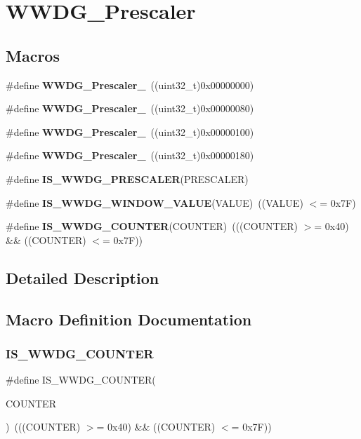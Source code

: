 \section{W\+W\+D\+G\+\_\+\+Prescaler}
\label{group__WWDG__Prescaler}
\subsection*{Macros}
\begin{DoxyCompactItemize}
\item 
\#define \textbf{ W\+W\+D\+G\+\_\+\+Prescaler\+\_}~((uint32\+\_\+t)0x00000000)
\item 
\#define \textbf{ W\+W\+D\+G\+\_\+\+Prescaler\+\_}~((uint32\+\_\+t)0x00000080)
\item 
\#define \textbf{ W\+W\+D\+G\+\_\+\+Prescaler\+\_}~((uint32\+\_\+t)0x00000100)
\item 
\#define \textbf{ W\+W\+D\+G\+\_\+\+Prescaler\+\_}~((uint32\+\_\+t)0x00000180)
\item 
\#define \textbf{ I\+S\+\_\+\+W\+W\+D\+G\+\_\+\+P\+R\+E\+S\+C\+A\+L\+ER}(P\+R\+E\+S\+C\+A\+L\+ER)
\item 
\#define \textbf{ I\+S\+\_\+\+W\+W\+D\+G\+\_\+\+W\+I\+N\+D\+O\+W\+\_\+\+V\+A\+L\+UE}(V\+A\+L\+UE)~((V\+A\+L\+UE) $<$= 0x7\+F)
\item 
\#define \textbf{ I\+S\+\_\+\+W\+W\+D\+G\+\_\+\+C\+O\+U\+N\+T\+ER}(C\+O\+U\+N\+T\+ER)~(((C\+O\+U\+N\+T\+ER) $>$= 0x40) \&\& ((\+C\+O\+U\+N\+T\+E\+R) $<$= 0x7\+F))
\end{DoxyCompactItemize}


\subsection{Detailed Description}


\subsection{Macro Definition Documentation}
\mbox{\label{group__WWDG__Prescaler_ga4728877128cd60494692d8f14389112e}} 
\subsubsection{I\+S\+\_\+\+W\+W\+D\+G\+\_\+\+C\+O\+U\+N\+T\+ER}
{\footnotesize\ttfamily \#define I\+S\+\_\+\+W\+W\+D\+G\+\_\+\+C\+O\+U\+N\+T\+ER(\begin{DoxyParamCaption}\item[{}]{C\+O\+U\+N\+T\+ER }\end{DoxyParamCaption})~(((C\+O\+U\+N\+T\+ER) $>$= 0x40) \&\& ((\+C\+O\+U\+N\+T\+E\+R) $<$= 0x7\+F))}



